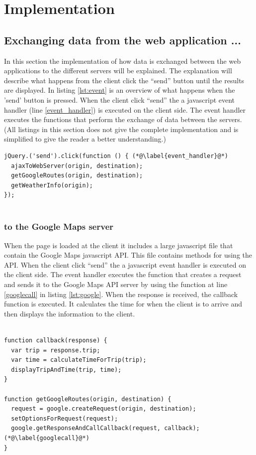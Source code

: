 \documentclass[10pt,a4paper]{article}
\begin{document}
\section{Implementation}

\subsection{Exchanging data from the web application ...}
\label{sec:sending-data-from}
In this section the implementation of how data is exchanged between the web applications to the different servers will be explained. The explanation will describe what happens from the client click the ``send'' button until the results are displayed. In listing \ref{lst:event} is an overview of what happens when the 'send' button is pressed. When the client click ``send'' the a javascript event handler (line \ref{event_handler}) is executed on the client side. The event handler executes the functions that perform the exchange of data between the servers. (All listings in this section does not give the complete implementation and is simplified to give the reader a better understanding.)

\begin{lstlisting}[caption=Event handler, label=lst:event]
jQuery.('send').click(function () { (*@\label{event_handler}@*)
  ajaxToWebServer(origin, destination);
  getGoogleRoutes(origin, destination);
  getWeatherInfo(origin);
});
  
\end{lstlisting}
\subsubsection{to the Google Maps server}
\label{sec:google-maps-javascr}
When the page is loaded at the client it includes a large javascript file that contain the Google Maps javascript API. This file contains methods for using the API.
When the client click ``send'' the a javascript event handler is executed on the client side. The event handler executes the function that creates a request and sends it to the Google Maps API server by using the function at line \ref{googlecall} in listing \ref{lst:google}. When the response is received, the callback function is  executed. It calculates the time for when the client is to arrive and then displays the information to the client.

\begin{lstlisting}[caption=Using the Google Maps javascript API, label=lst:google]

function callback(response) {
  var trip = response.trip;
  var time = calculateTimeForTrip(trip);
  displayTripAndTime(trip, time);
}

function getGoogleRoutes(origin, destination) {
  request = google.createRequest(origin, destination);
  setOptionsForRequest(request);
  google.getResponseAndCallCallback(request, callback); (*@\label{googlecall}@*)
}
  
\end{lstlisting}
\end{document}
